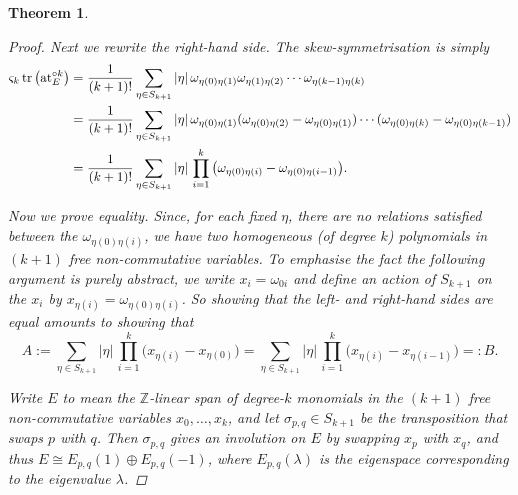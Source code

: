 \documentclass[11pt,fleqn]{article}
\theoremstyle{plain}
\newtheorem{theorem}{Theorem}[subsection]
\theoremstyle{definition}
\theoremstyle{remark}
\numberwithin{equation}{theorem}
\newcommand{\at}{\mathrm{at}}
\newcommand{\expat}[1]{\at^{\circ#1}}
\newcommand{\sym}[1]{S_{#1}}
\newcommand{\sgn}[1]{|#1|}
\renewcommand{\ss}[1]{\varsigma_{#1}}
\begin{document}
\begin{theorem}
\begin{proof}
                Next we rewrite the right-hand side.
                The skew-symmetrisation is simply
                \begin{align*}
                    \ss{k}\tr\left(
                        \expat{k}_E
                    \right)
                    &=
                    \frac{1}{(k+1)!} \sum_{\eta\in \sym{k+1}}
                        \sgn{\eta}\, \omega_{\eta(0)\eta(1)} \omega_{\eta(1)\eta(2)} \cdots \omega_{\eta(k-1)\eta(k)}
                \\  &= \frac{1}{(k+1)!} \sum_{\eta\in \sym{k+1}}
                        \sgn{\eta}\, \omega_{\eta(0)\eta(1)}(\omega_{\eta(0)\eta(2)}-\omega_{\eta(0)\eta(1)}) \cdots (\omega_{\eta(0)\eta(k)}-\omega_{\eta(0)\eta(k-1)})
                \\  &= \frac{1}{(k+1)!} \sum_{\eta\in \sym{k+1}}
                        \sgn{\eta}\,
                            \prod_{i=1}^k
                                \big(\omega_{\eta(0)\eta(i)}-\omega_{\eta(0)\eta(i-1)}\big).
                \end{align*}

                Now we prove equality.
                Since, \emph{for each fixed $\eta$}, there are no relations satisfied between the $\omega_{\eta(0)\eta(i)}$, we have two homogeneous (of degree $k$) polynomials in $(k+1)$ free non-commutative variables.
                To emphasise the fact the following argument is purely abstract, we write $x_i=\omega_{0i}$ and define an action of $S_{k+1}$ on the $x_i$ by $x_{\eta(i)}=\omega_{\eta(0)\eta(i)}$.
                So showing that the left- and right-hand sides are equal amounts to showing that
                \[
                    A :=
                    \sum_{\eta\in \sym{k+1}}
                        \sgn{\eta}\,
                            \prod_{i=1}^k
                                \big(x_{\eta(i)}-x_{\eta(0)}\big)
                    =
                    \sum_{\eta\in \sym{k+1}}
                        \sgn{\eta}\,
                            \prod_{i=1}^k
                                \big(x_{\eta(i)}-x_{\eta(i-1)}\big)
                    =: B.
                \]

                Write $E$ to mean the $\mathbb{Z}$-linear span of degree-$k$ monomials in the $(k+1)$ free non-commutative variables $x_0,\ldots,x_k$, and let $\sigma_{p,q}\in S_{k+1}$ be the transposition that swaps $p$ with $q$.
                Then $\sigma_{p,q}$ gives an involution on $E$ by swapping $x_p$ with $x_q$, and thus $E\cong E_{p,q}(1)\oplus E_{p,q}(-1)$, where $E_{p,q}(\lambda)$ is the eigenspace corresponding to the eigenvalue $\lambda$.


\end{proof}
\end{theorem}
\end{document}
